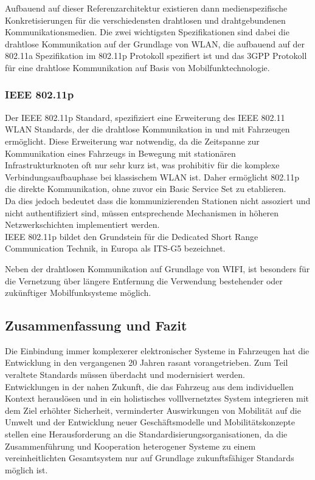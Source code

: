     Aufbauend auf dieser Referenzarchitektur existieren dann medienspezifische Konkretisierungen für die verschiedensten drahtlosen und drahtgebundenen Kommunikationsmedien.
    Die zwei wichtigsten Spezifikationen sind dabei die drahtlose Kommunikation auf der Grundlage von WLAN, die aufbauend auf der 802.11a Spezifikation im 802.11p Protokoll spezifiert ist 
    und das 3GPP Protokoll für eine drahtlose Kommunikation auf Basis von Mobilfunktechnologie.

    \subsubsection{IEEE 802.11p}
    Der IEEE 802.11p Standard, spezifiziert eine Erweiterung des IEEE 802.11 WLAN Standards, der die drahtlose Kommunikation in und mit Fahrzeugen ermöglicht.
    Diese Erweiterung war notwendig, da die Zeitspanne zur Kommunikation eines Fahrzeugs in Bewegung mit stationären Infrastrukturknoten oft nur sehr kurz ist, was prohibitiv für die komplexe Verbindungsaufbauphase
    bei klassischem WLAN ist. Daher ermöglicht 802.11p die direkte Kommunikation, ohne zuvor ein Basic Service Set zu etablieren.\\
    Da dies jedoch bedeutet dass die kommunizierenden Stationen nicht assoziert und nicht authentifiziert sind, müssen entsprechende Mechanismen in höheren Netzwerkschichten
    implementiert werden.\\
    IEEE 802.11p bildet den Grundstein für die Dedicated Short Range Communication Technik, in Europa als ITS-G5 bezeichnet. 
    
    Neben der drahtlosen Kommunikation auf Grundlage von WIFI, ist besonders für die Vernetzung über längere Entfernung die Verwendung bestehender oder zukünftiger Mobilfunksysteme möglich. 

   
    \subsection{Zusammenfassung und Fazit}
    Die Einbindung immer komplexerer elektronischer Systeme in Fahrzeugen hat die Entwicklung in den vergangenen
    20 Jahren rasant vorangetrieben. Zum Teil veraltete Standards müssen überdacht und modernisiert werden.\\
    Entwicklungen in der nahen Zukunft, die das Fahrzeug aus dem individuellen Kontext herauslösen und in ein holistisches volllvernetztes
    System integrieren mit dem Ziel erhöhter Sicherheit, verminderter Auswirkungen von Mobilität auf die Umwelt und der Entwicklung neuer Geschäftsmodelle
    und Mobilitätskonzepte stellen eine Herausforderung an die Standardisierungsorganisationen, da die Zusammenführung und Kooperation heterogener Systeme zu einem
    vereinheitlichten Gesamtsystem nur auf Grundlage zukunftsfähiger Standards möglich ist.\\
    
